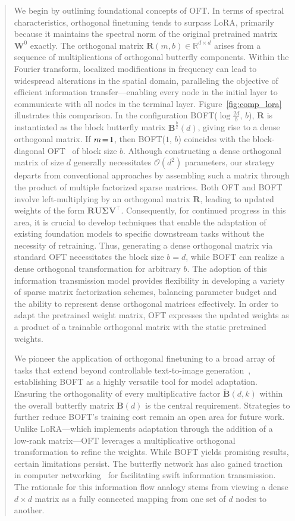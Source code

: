 \begin{abstract}
We begin by outlining foundational concepts of OFT. In terms of spectral characteristics, orthogonal finetuning tends to surpass LoRA, primarily because it maintains the spectral norm of the original pretrained matrix $\bm{W}^0$ exactly. The orthogonal matrix $\bm{R}(m,b) \in \mathbb{R}^{d \times d}$ arises from a sequence of multiplications of orthogonal butterfly components. Within the Fourier transform, localized modifications in frequency can lead to widespread alterations in the spatial domain, paralleling the objective of efficient information transfer—enabling every node in the initial layer to communicate with all nodes in the terminal layer. Figure~\ref{fig:comp_lora} illustrates this comparison. In the configuration BOFT($\log \frac{2d}{b}$, $b$), $\bm{R}$ is instantiated as the block butterfly matrix $\bm{B}^{\frac{b}{2}}(d)$, giving rise to a dense orthogonal matrix. If $\thickmuskip=2mu \medmuskip=2mu m=1$, then BOFT($1$, $b$) coincides with the block-diagonal OFT~\cite{qiu2023controlling} of block size $b$. Although constructing a dense orthogonal matrix of size $d$ generally necessitates $\mathcal{O}(d^2)$ parameters, our strategy departs from conventional approaches by assembling such a matrix through the product of multiple factorized sparse matrices. Both OFT and BOFT involve left-multiplying by an orthogonal matrix $\bm{R}$, leading to updated weights of the form $\bm{R}\bm{U}\bm{\Sigma}\bm{V}^\top$. Consequently, for continued progress in this area, it is crucial to develop techniques that enable the adaptation of existing foundation models to specific downstream tasks without the necessity of retraining. Thus, generating a dense orthogonal matrix via standard OFT necessitates the block size $b=d$, while BOFT can realize a dense orthogonal transformation for arbitrary $b$. The adoption of this information transmission model provides flexibility in developing a variety of sparse matrix factorization schemes, balancing parameter budget and the ability to represent dense orthogonal matrices effectively. In order to adapt the pretrained weight matrix, OFT expresses the updated weights as a product of a trainable orthogonal matrix with the static pretrained weights. \item We pioneer the application of orthogonal finetuning to a broad array of tasks that extend beyond controllable text-to-image generation~\cite{qiu2023controlling}, establishing BOFT as a highly versatile tool for model adaptation. Ensuring the orthogonality of every multiplicative factor $\tilde{\bm{B}}(d,k)$ within the overall butterfly matrix $\bm{B}(d)$ is the central requirement. Strategies to further reduce BOFT’s training cost remain an open area for future work. Unlike LoRA—which implements adaptation through the addition of a low-rank matrix—OFT leverages a multiplicative orthogonal transformation to refine the weights. While BOFT yields promising results, certain limitations persist. The butterfly network has also gained traction in computer networking~\cite{solihin2015fundamentals,li2011linear} for facilitating swift information transmission. The rationale for this information flow analogy stems from viewing a dense $d\times d$ matrix as a fully connected mapping from one set of $d$ nodes to another. 
\end{abstract}
